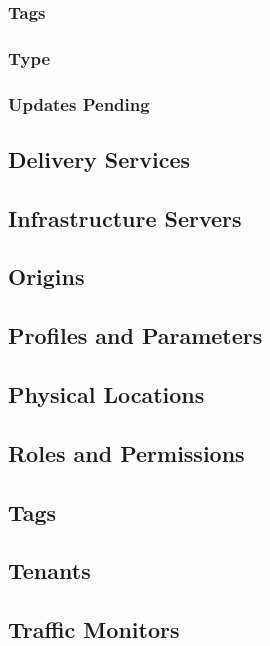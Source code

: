 \subsubsection{Tags}

\subsubsection{Type}

\subsubsection{Updates Pending}

\subsection{Delivery Services}

\subsection{Infrastructure Servers}

\subsection{Origins}

\subsection{Profiles and Parameters}

\subsection{Physical Locations}

\subsection{Roles and Permissions\label{sec:roles-and-perms}}

\subsection{Tags}

\subsection{Tenants}

\subsection{Traffic Monitors}

